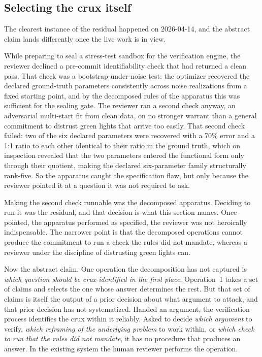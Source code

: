 \documentclass[
  11pt,
]{article}
\begin{document}
\subsection{Selecting the crux
itself}\label{selecting-the-crux-itself}

The clearest instance of the residual happened on 2026-04-14, and the
abstract claim lands differently once the live work is in view.

While preparing to seal a stress-test sandbox for the verification engine,
the reviewer declined a pre-commit identifiability check that had returned
a clean pass. That check was a bootstrap-under-noise test: the optimizer
recovered the declared ground-truth parameters consistently across noise
realizations from a fixed starting point, and by the decomposed rules of
the apparatus this was sufficient for the sealing gate. The reviewer ran a
second check anyway, an adversarial multi-start fit from clean data, on no
stronger warrant than a general commitment to distrust green lights that
arrive too easily. That second check failed: two of the six declared
parameters were recovered with a 70\% error and a 1:1 ratio to each other
identical to their ratio in the ground truth, which on inspection revealed
that the two parameters entered the functional form only through their
quotient, making the declared six-parameter family structurally rank-five.
So the apparatus caught the specification flaw, but only because the
reviewer pointed it at a question it was not required to ask.

Making the second check runnable was the decomposed apparatus. Deciding to
run it was the residual, and that decision is what this section names. Once
pointed, the apparatus performed as specified, the reviewer was not
heroically indispensable. The narrower point is that the decomposed
operations cannot produce the commitment to run a check the rules did not
mandate, whereas a reviewer under the discipline of distrusting green
lights can.

Now the abstract claim. One operation the decomposition has not captured
is \emph{which question should be crux-identified in the first
place}. Operation~1 takes a set of claims and selects the one whose answer
determines the rest. But that set of claims is itself the output of a
prior decision about what argument to attack, and that prior decision has
not systematized. Handed an argument, the verification process identifies
the crux within it reliably. Asked to decide \emph{which
argument} to verify, \emph{which reframing of the underlying problem} to
work within, or \emph{which check to run that the rules did not mandate},
it has no procedure that produces an answer. In the existing system the
human reviewer performs the operation.
\end{document}
